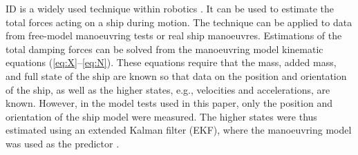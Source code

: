 ID is a widely used technique within robotics \citep{faber_inverse_2018}. It can be used to estimate the total forces acting on a ship during motion. The technique can be applied to data from free-model manoeuvring tests or real ship manoeuvres. 
Estimations of the total damping forces can be solved from the manoeuvring model kinematic equations  (\autoref{eq:X}--\autoref{eq:N}). These equations require that the mass, added mass, and full state of the ship are known so that data on the position and orientation of the ship, as well as the higher states, e.g., velocities and accelerations, are known.
However, in the model tests used in this paper, only the position and orientation of the ship model were measured.
The higher states were thus estimated using an extended Kalman filter (EKF), where the manoeuvring model was used as the predictor \citep{alexandersson_system_2022}.

